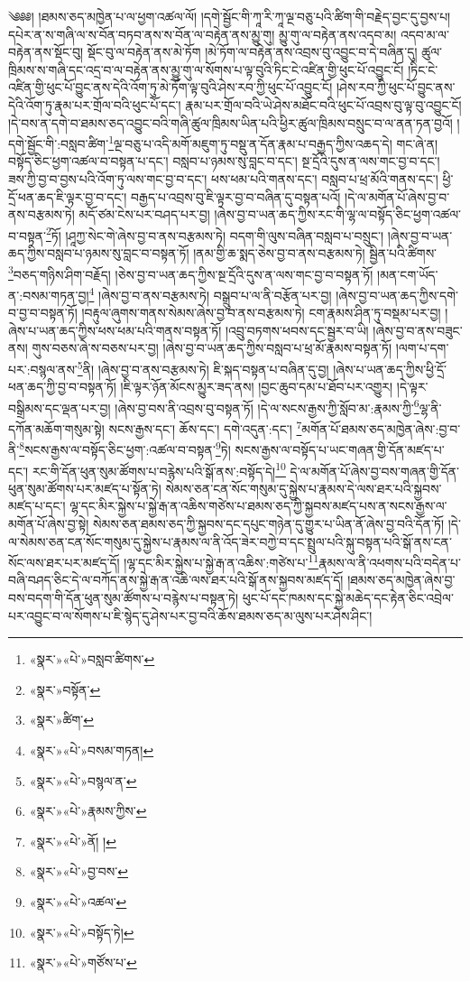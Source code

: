 ༄༅༅། །ཐམས་ཅད་མཁྱེན་པ་ལ་ཕྱག་འཚལ་ལོ། །དགེ་སྦྱོང་གི་ཀཱ་རི་ཀཱ་ལྔ་བཅུ་པའི་ཚིག་གི་བརྗེད་བྱང་དུ་བྱས་པ། དཔེར་ན་ས་གཞི་ལ་ས་བོན་བཏབ་ནས་ས་བོན་ལ་བརྟེན་ནས་མྱུ་གུ། མྱུ་གུ་ལ་བརྟེན་ནས་འདབ་མ། འདབ་མ་ལ་བརྟེན་ནས་སྡོང་བུ། སྡོང་བུ་ལ་བརྟེན་ནས་མེ་ཏོག །མེ་ཏོག་ལ་བརྟེན་ནས་འབྲས་བུ་འབྱུང་བ་དེ་བཞིན་དུ། ཚུལ་ཁྲིམས་ས་གཞི་དང་འདྲ་བ་ལ་བརྟེན་ནས་མྱུ་གུ་ལ་སོགས་པ་ལྟ་བུའི་ཏིང་ངེ་འཛིན་གྱི་ཕུང་པོ་འབྱུང་ངོ། །ཏིང་ངེ་འཛིན་གྱི་ཕུང་པོ་བྱུང་ནས་དེའི་འོག་ཏུ་མེ་ཏོག་ལྟ་བུའི་ཤེས་རབ་ཀྱི་ཕུང་པོ་འབྱུང་ངོ། །ཤེས་རབ་ཀྱི་ཕུང་པོ་བྱུང་ནས་དེའི་འོག་ཏུ་རྣམ་པར་གྲོལ་བའི་ཕུང་པོ་དང་། རྣམ་པར་གྲོལ་བའི་ཡེ་ཤེས་མཐོང་བའི་ཕུང་པོ་འབྲས་བུ་ལྟ་བུ་འབྱུང་ངོ། །དེ་བས་ན་དགེ་བ་ཐམས་ཅད་འབྱུང་བའི་གཞི་ཚུལ་ཁྲིམས་ཡིན་པའི་ཕྱིར་ཚུལ་ཁྲིམས་བསྲུང་བ་ལ་ནན་ཏན་བྱའོ། །དགེ་སྦྱོང་གི་:བསླབ་ཚིག་\footnote{«སྣར་»«པེ་»བསླབ་ཚིགས་}ལྔ་བཅུ་པ་འདི་མགོ་མཇུག་ཏུ་བསྡུ་ན་དོན་རྣམ་པ་བརྒྱད་ཀྱིས་འཆད་དེ། གང་ཞེ་ན། བསྟོད་ཅིང་ཕྱག་འཚལ་བ་བསྟན་པ་དང་། བསླབ་པ་ཉམས་སུ་བླང་བ་དང་། སྔ་དྲོའི་དུས་ན་ལས་གང་བྱ་བ་དང་། ཟས་ཀྱི་བྱ་བ་བྱས་པའི་འོག་ཏུ་ལས་གང་བྱ་བ་དང་། ཕས་ཕམ་པའི་གནས་དང་། བསླབ་པ་ཕྲ་མོའི་གནས་དང་། ཕྱི་དྲོ་ཕན་ཆད་ཇི་ལྟར་བྱ་བ་དང་། བརྒྱད་པ་འབྲས་བུ་ཇི་ལྟར་བྱ་བ་བཞིན་དུ་བསྟན་པའོ། །དེ་ལ་མགོན་པོ་ཞེས་བྱ་བ་ནས་བརྩམས་ཏེ། མདོ་ཙམ་ངེས་པར་བཤད་པར་བྱ། །ཞེས་བྱ་བ་ཡན་ཆད་ཀྱིས་རང་གི་ལྷ་ལ་བསྟོད་ཅིང་ཕྱག་འཚལ་བ་བསྟན་\footnote{«སྣར་»བསྟོན་}ཏོ། །ཤཱཀྱ་སེང་གེ་ཞེས་བྱ་བ་ནས་བརྩམས་ཏེ། བདག་གི་ལུས་བཞིན་བསླབ་པ་བསྲུང་། །ཞེས་བྱ་བ་ཡན་ཆད་ཀྱིས་བསླབ་པ་ཉམས་སུ་བླང་བ་བསྟན་ཏོ། །ནམ་གྱི་ཆ་སྨད་ཅེས་བྱ་བ་ནས་བརྩམས་ཏེ། སྦྱིན་པའི་ཚིགས་\footnote{«སྣར་»ཚིག་}བཅད་གཉིས་ཤིག་བརྗོད། །ཅེས་བྱ་བ་ཡན་ཆད་ཀྱིས་སྔ་དྲོའི་དུས་ན་ལས་གང་བྱ་བ་བསྟན་ཏོ། །མན་ངག་ཡོད་ན་:བསམ་གཏན་བྱ།\footnote{«སྣར་»«པེ་»བསམ་གཏན།} །ཞེས་བྱ་བ་ནས་བརྩམས་ཏེ། བསྒྲུབ་པ་ལ་ནི་བརྩོན་པར་བྱ། །ཞེས་བྱ་བ་ཡན་ཆད་ཀྱིས་དགེ་བ་བྱ་བ་བསྟན་ཏོ། །བརྟུལ་ཞུགས་གནས་སེམས་ཞེས་བྱ་བ་ནས་བརྩམས་ཏེ། ངག་རྣམས་ཤིན་ཏུ་བསྡམ་པར་བྱ། །ཞེས་པ་ཡན་ཆད་ཀྱིས་ཕས་ཕམ་པའི་གནས་བསྟན་ཏོ། །འབྲུ་བཏགས་ཕབས་དང་སྦྱར་བ་ཡི། །ཞེས་བྱ་བ་ནས་བཟུང་ནས། གུས་བཅས་ཞེ་ས་བཅས་པར་བྱ། །ཞེས་བྱ་བ་ཡན་ཆད་ཀྱིས་བསླབ་པ་ཕྲ་མོ་རྣམས་བསྟན་ཏོ། །ལག་པ་དག་པར་:བསྙལ་ནས་\footnote{«སྣར་»«པེ་»བསྙལ་ན་}ནི། །ཞེས་བྱ་བ་ནས་བརྩམས་ཏེ། ཇི་སྐད་བསྟན་པ་བཞིན་དུ་བྱ། །ཞེས་པ་ཡན་ཆད་ཀྱིས་ཕྱི་དྲོ་ཕན་ཆད་ཀྱི་བྱ་བ་བསྟན་ཏོ། །ཇི་ལྟར་ཉོན་མོངས་མྱུར་ཟད་ནས། །བྱང་ཆུབ་དམ་པ་ཐོབ་པར་འགྱུར། །དེ་ལྟར་བསྒྲིམས་དང་ལྡན་པར་བྱ། །ཞེས་བྱ་བས་ནི་འབྲས་བུ་བསྟན་ཏོ། །དེ་ལ་སངས་རྒྱས་ཀྱི་སློབ་མ་:རྣམས་ཀྱི་\footnote{«སྣར་»«པེ་»རྣམས་ཀྱིས་}ལྷ་ནི་དཀོན་མཆོག་གསུམ་སྟེ། སངས་རྒྱས་དང་། ཆོས་དང་། དགེ་འདུན་:དང་། \footnote{«སྣར་»«པེ་»ནོ། ། }མགོན་པོ་ཐམས་ཅད་མཁྱེན་ཞེས་:བྱ་བ་ནི་\footnote{«སྣར་»«པེ་»བྱ་བས་}སངས་རྒྱས་ལ་བསྟོད་ཅིང་ཕྱག་:འཚལ་བ་བསྟན་\footnote{«སྣར་»«པེ་»འཚལ་}ཏེ། སངས་རྒྱས་ལ་བསྟོད་པ་ཡང་གཞན་གྱི་དོན་མཛད་པ་དང་། རང་གི་དོན་ཕུན་སུམ་ཚོགས་པ་བརྙེས་པའི་སྒོ་ནས་:བསྟོད་དེ།\footnote{«སྣར་»«པེ་»བསྟོད་ཏེ།} དེ་ལ་མགོན་པོ་ཞེས་བྱ་བས་གཞན་གྱི་དོན་ཕུན་སུམ་ཚོགས་པར་མཛད་པ་སྟོན་ཏེ། སེམས་ཅན་ངན་སོང་གསུམ་དུ་སྐྱེས་པ་རྣམས་དེ་ལས་ཐར་པའི་སྐྱབས་མཛད་པ་དང་། ལྷ་དང་མིར་སྐྱེས་པ་སྐྱེ་རྒ་ན་འཆིས་གཙེས་པ་ཐམས་ཅད་ཀྱི་སྐྱབས་མཛད་པས་ན་སངས་རྒྱས་ལ་མགོན་པོ་ཞེས་བྱ་སྟེ། སེམས་ཅན་ཐམས་ཅད་ཀྱི་སྐྱབས་དང་དཔུང་གཉེན་དུ་གྱུར་པ་ཡིན་ནོ་ཞེས་བྱ་བའི་དོན་ཏོ། །དེ་ལ་སེམས་ཅན་ངན་སོང་གསུམ་དུ་སྐྱེས་པ་རྣམས་ལ་ནི་འོད་ཟེར་བཀྱེ་བ་དང་སྤྲུལ་པའི་སྐུ་བསྟན་པའི་སྒོ་ནས་ངན་སོང་ལས་ཐར་པར་མཛད་དོ། །ལྷ་དང་མིར་སྐྱེས་པ་སྐྱེ་རྒ་ན་འཆིས་:གཙེས་པ་\footnote{«སྣར་»«པེ་»གཙོས་པ་}རྣམས་ལ་ནི་འཕགས་པའི་བདེན་པ་བཞི་བཤད་ཅིང་དེ་ལ་བཀོད་ནས་སྐྱེ་རྒ་ན་འཆི་ལས་ཐར་པའི་སྒོ་ནས་སྐྱབས་མཛད་དོ། །ཐམས་ཅད་མཁྱེན་ཞེས་བྱ་བས་བདག་གི་དོན་ཕུན་སུམ་ཚོགས་པ་བརྙེས་པ་བསྟན་ཏེ། ཕུང་པོ་དང་ཁམས་དང་སྐྱེ་མཆེད་དང་རྟེན་ཅིང་འབྲེལ་པར་འབྱུང་བ་ལ་སོགས་པ་ཇི་སྙེད་དུ་ཤེས་པར་བྱ་བའི་ཆོས་ཐམས་ཅད་མ་ལུས་པར་ཤེས་ཤིང་། 